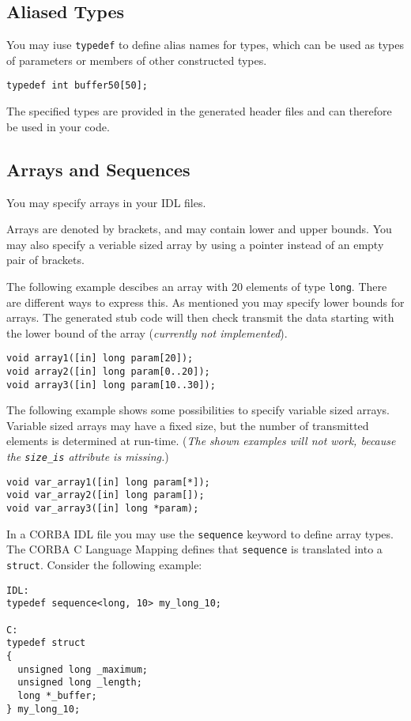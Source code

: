 \subsection{Aliased Types}
You may iuse {\tt typedef} to define alias names for types, which
can be used as types of parameters or members of other constructed 
types.

\begin{verbatim}
typedef int buffer50[50];
\end{verbatim}

The specified types are provided in the generated header files and
can therefore be used in your code.

\subsection{Arrays and Sequences}
You may specify arrays in your IDL files.

Arrays are denoted by brackets, and may contain lower and upper bounds.
You may also specify a veriable sized array by using a pointer instead
of an empty pair of brackets.

The following example descibes an array with 20 elements of type \verb|long|.
There are different ways to express this. As mentioned you may specify 
lower bounds for arrays. The generated stub code will then check transmit
the data starting with the lower bound of the array ({\em currently
not implemented}). 

\begin{verbatim}
void array1([in] long param[20]);
void array2([in] long param[0..20]);
void array3([in] long param[10..30]);
\end{verbatim}

The following example shows some possibilities to specify variable
sized arrays. Variable sized arrays may have a fixed size, but the 
number of transmitted elements is determined at run-time. ({\em The
shown examples will not work, because the \verb|size_is| attribute
is missing.})

\begin{verbatim}
void var_array1([in] long param[*]);
void var_array2([in] long param[]);
void var_array3([in] long *param);
\end{verbatim}

In a CORBA IDL file you may use the {\tt sequence} keyword to define
array types. The CORBA C Language Mapping defines that {\tt sequence}
is translated into a {\tt struct}. Consider the following example:
\begin{verbatim}
IDL:
typedef sequence<long, 10> my_long_10;

C:
typedef struct
{
  unsigned long _maximum;
  unsigned long _length;
  long *_buffer;
} my_long_10;
\end{verbatim}

